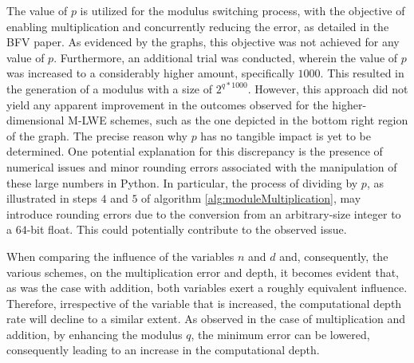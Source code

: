 The value of $p$ is utilized for the modulus switching process, with the objective of enabling multiplication and concurrently reducing the error, as detailed in the BFV paper. As evidenced by the graphs, this objective was not achieved for any value of $p$. Furthermore, an additional trial was conducted, wherein the value of $p$ was increased to a considerably higher amount, specifically $1000$. This resulted in the generation of a modulus with a size of $2^{q*1000}$. However, this approach did not yield any apparent improvement in the outcomes observed for the higher-dimensional M-LWE schemes, such as the one depicted in the bottom right region of the graph. The precise reason why $p$ has no tangible impact is yet to be determined. One potential explanation for this discrepancy is the presence of numerical issues and minor rounding errors associated with the manipulation of these large numbers in Python. In particular, the process of dividing by $p$, as illustrated in steps $4$ and $5$ of algorithm \ref{alg:moduleMultiplication}, may introduce rounding errors due to the conversion from an arbitrary-size integer to a $64$-bit float. This could potentially contribute to the observed issue.

When comparing the influence of the variables $n$ and $d$ and, consequently, the various schemes, on the multiplication error and depth, it becomes evident that, as was the case with addition, both variables exert a roughly equivalent influence. Therefore, irrespective of the variable that is increased, the computational depth rate will decline to a similar extent. As observed in the case of multiplication and addition, by enhancing the modulus $q$, the minimum error can be lowered, consequently leading to an increase in the computational depth.

